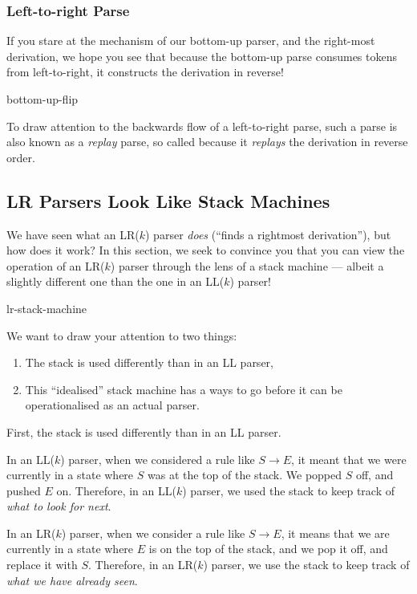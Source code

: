 \subsubsection{Left-to-right Parse}
If you stare at the mechanism of our bottom-up parser, and the right-most derivation, we hope you see that because the bottom-up parse consumes tokens from left-to-right, it  constructs the derivation in reverse! 

\begin{center}
    {bottom-up-flip}
\end{center}

To draw attention to the backwards flow of a left-to-right parse, such a parse is also known as a \textit{replay} parse, so called because it \textit{replays} the derivation in reverse order.

\subsection{LR Parsers Look Like Stack Machines}\label{section:lr-stack-machine}
We have seen what an LR($k$) parser \textit{does} (``finds a rightmost derivation''), but how does it work? In this section, we seek to convince you that you can view the operation of an LR($k$) parser through the lens of a stack machine --- albeit a slightly different one than the one in an LL($k$) parser!

\begin{center}
    {lr-stack-machine}
\end{center}

We want to draw your attention to two things:
\begin{enumerate}
    \item The stack is used differently than in an LL parser,
    \item This ``idealised'' stack machine has a ways to go before it can be operationalised as an actual parser.
\end{enumerate}

First, the stack is used differently than in an LL parser.

In an LL($k$) parser, when we considered a rule like $S \rightarrow E$, it meant that we were currently in a state where $S$ was at the top of the stack. We popped $S$ off, and pushed $E$ on. Therefore, in an LL($k$) parser, we used the stack to keep track of \textit{what to look for next}. 

In an LR($k$) parser, when we consider a rule like $S \rightarrow E$, it means that we are currently in a state where $E$ is on the top of the stack, and we pop it off, and replace it with $S$. Therefore, in an LR($k$) parser, we use the stack to keep track of \textit{what we have already seen}.

